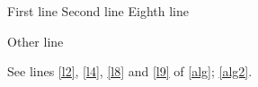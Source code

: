 \documentclass{article}
\begin{document}
\begin{algorithm}
\caption{Alg.}\label{alg}
First line\;
Second line \label{l2}\;
Eighth line\; \label{l8}
\end{algorithm}
\begin{algorithm}\label{alg2}
Other line\;
\caption{Two.}
\end{algorithm}
See lines \ref{l2}, \ref{l4}, \ref{l8} and \ref{l9} of \ref{alg}; \ref{alg2}.
\end{document}
